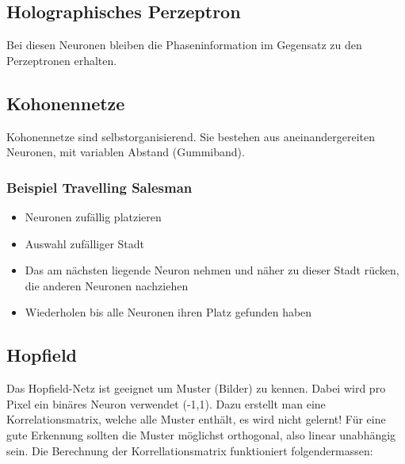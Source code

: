 \subsection{Holographisches Perzeptron}
Bei diesen Neuronen bleiben die Phaseninformation im Gegensatz zu den
Perzeptronen erhalten.

\subsection{Kohonennetze}
Kohonennetze sind selbstorganisierend. Sie bestehen aus aneinandergereiten
Neuronen, mit variablen Abstand (Gummiband).

\subsubsection{Beispiel Travelling Salesman}
\begin{itemize}
	\item Neuronen zufällig platzieren
	\item Auswahl zufälliger Stadt
	\item Das am nächsten liegende Neuron nehmen und näher zu dieser Stadt rücken, die anderen Neuronen nachziehen
	\item Wiederholen bis alle Neuronen ihren Platz gefunden haben
\end{itemize}

\subsection{Hopfield}
Das Hopfield-Netz ist geeignet um Muster (Bilder) zu kennen. Dabei wird pro
Pixel ein binäres Neuron verwendet (-1,1).  Dazu erstellt man eine
Korrelationsmatrix, welche alle Muster enthält, es wird nicht gelernt!  Für eine
gute Erkennung sollten die Muster möglichst orthogonal, also linear unabhängig
sein.  Die Berechnung der Korrellationsmatrix funktioniert folgendermassen:

